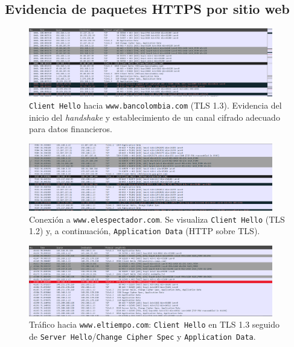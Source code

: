 \documentclass[10pt]{article}
\begin{document}
\subsection*{Evidencia de paquetes HTTPS por sitio web}

\begin{figure}[H]
    \centering
    \includegraphics[width=0.95\textwidth]{lab-02-screenshots/8.5-HTTPS-bancolombia.png}
    \caption{\texttt{Client Hello} hacia \texttt{www.bancolombia.com} (TLS 1.3). Evidencia del inicio del \textit{handshake} y establecimiento de un canal cifrado adecuado para datos financieros.}
\end{figure}

\begin{figure}[H]
    \centering
    \includegraphics[width=0.95\textwidth]{lab-02-screenshots/8.5-HTTPS-elespectador.png}
    \caption{Conexión a \texttt{www.elespectador.com}. Se visualiza \texttt{Client Hello} (TLS 1.2) y, a continuación, \texttt{Application Data} (HTTP sobre TLS).}
\end{figure}

\begin{figure}[H]
    \centering
    \includegraphics[width=0.95\textwidth]{lab-02-screenshots/8.5-HTTPS-eltiempo.png}
    \caption{Tráfico hacia \texttt{www.eltiempo.com}: \texttt{Client Hello} en TLS 1.3 seguido de \texttt{Server Hello}/\texttt{Change Cipher Spec} y \texttt{Application Data}.}
\end{figure}
\end{document}
